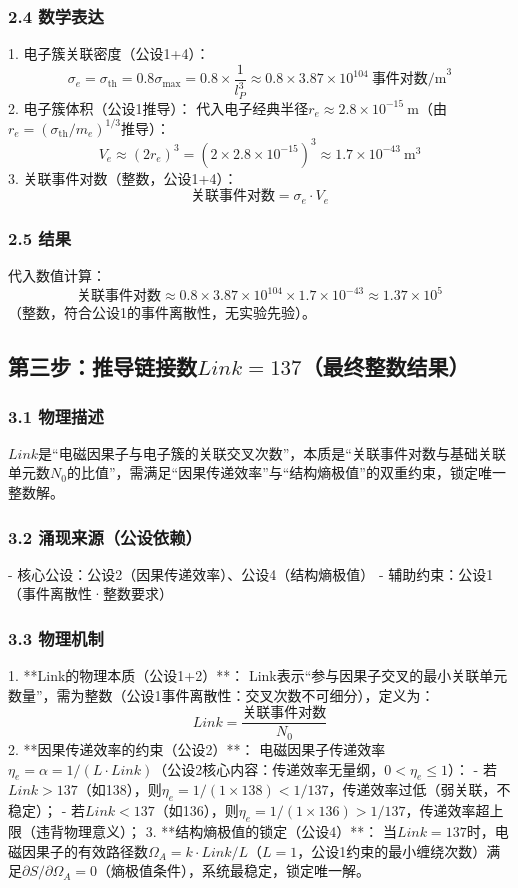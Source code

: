 \documentclass{article}
\begin{document}
\subsubsection{2.4 数学表达}
1. 电子簇关联密度（公设1+4）：  
   \[
   \sigma_e = \sigma_{\text{th}} = 0.8\sigma_{\text{max}} = 0.8 \times \frac{1}{l_P^3} \approx 0.8 \times 3.87 \times 10^{104}\ \text{事件对数/m}^3
   \]
2. 电子簇体积（公设1推导）：  
   代入电子经典半径\(r_e \approx 2.8 \times 10^{-15}\ \text{m}\)（由\(r_e = (\sigma_{\text{th}}/m_e)^{1/3}\)推导）：  
   \[
   V_e \approx (2r_e)^3 = (2 \times 2.8 \times 10^{-15})^3 \approx 1.7 \times 10^{-43}\ \text{m}^3
   \]
3. 关联事件对数（整数，公设1+4）：  
   \[
   \text{关联事件对数} = \sigma_e \cdot V_e
   \]

\subsubsection{2.5 结果}
代入数值计算：  
\[
\text{关联事件对数} \approx 0.8 \times 3.87 \times 10^{104} \times 1.7 \times 10^{-43} \approx 1.37 \times 10^5
\]
（整数，符合公设1的事件离散性，无实验先验）。


\subsection{第三步：推导链接数\(Link=137\)（最终整数结果）}
\subsubsection{3.1 物理描述}
\(Link\)是“电磁因果子与电子簇的关联交叉次数”，本质是“关联事件对数与基础关联单元数\(N_0\)的比值”，需满足“因果传递效率”与“结构熵极值”的双重约束，锁定唯一整数解。

\subsubsection{3.2 涌现来源（公设依赖）}
- 核心公设：公设2（因果传递效率）、公设4（结构熵极值）
- 辅助约束：公设1（事件离散性·整数要求）

\subsubsection{3.3 物理机制}
1. **Link的物理本质（公设1+2）**：  
   Link表示“参与因果子交叉的最小关联单元数量”，需为整数（公设1事件离散性：交叉次数不可细分），定义为：  
   \[
   Link = \frac{\text{关联事件对数}}{N_0}
   \]
2. **因果传递效率的约束（公设2）**：  
   电磁因果子传递效率\(\eta_e = \alpha = 1/(L \cdot Link)\)（公设2核心内容：传递效率无量纲，\(0<\eta_e \leq1\)）：  
   - 若\(Link>137\)（如138），则\(\eta_e = 1/(1 \times 138) < 1/137\)，传递效率过低（弱关联，不稳定）；  
   - 若\(Link<137\)（如136），则\(\eta_e = 1/(1 \times 136) > 1/137\)，传递效率超上限（违背物理意义）；  
3. **结构熵极值的锁定（公设4）**：  
   当\(Link=137\)时，电磁因果子的有效路径数\(\Omega_A = k \cdot Link/L\)（\(L=1\)，公设1约束的最小缠绕次数）满足\(\partial S/\partial \Omega_A = 0\)（熵极值条件），系统最稳定，锁定唯一解。
\end{document}
